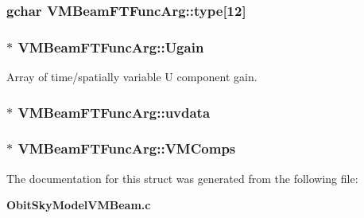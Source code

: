 \subsubsection{\setlength{\rightskip}{0pt plus 5cm}gchar {\bf VMBeam\-FTFunc\-Arg::type}[12]}\label{structVMBeamFTFuncArg_o0}


\subsubsection{$\ast$ {\bf VMBeam\-FTFunc\-Arg::Ugain}}\label{structVMBeamFTFuncArg_o21}


Array of time/spatially variable U component gain. 

\subsubsection{$\ast$ {\bf VMBeam\-FTFunc\-Arg::uvdata}}\label{structVMBeamFTFuncArg_o3}


\subsubsection{$\ast$ {\bf VMBeam\-FTFunc\-Arg::VMComps}}\label{structVMBeamFTFuncArg_o15}




The documentation for this struct was generated from the following file:\begin{CompactItemize}
\item 
{\bf Obit\-Sky\-Model\-VMBeam.c}\end{CompactItemize}
